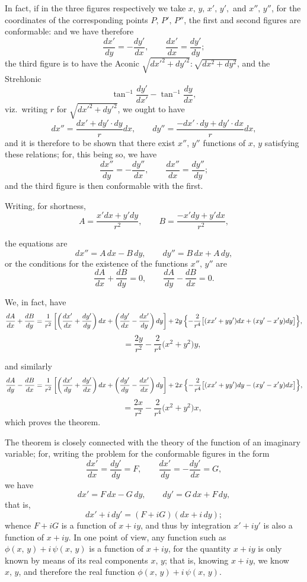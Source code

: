 \documentclass[11pt]{article}
\begin{document}
\medskip

\noindent
In fact, if in the three figures respectively we take $x,\,y,\,x',\,y',$ and $x'',\,y''$, for
the coordinates of the corresponding points $P,\,P',\,P''$, the first and second figures
are conformable: and we have therefore
\[
\frac{dx'}{dy} = -\frac{dy'}{dx},\qquad \frac{dx'}{dx} = \frac{dy'}{dy};
\]
the third figure is to have the Aconic $\sqrt{dx'^2 + dy'^2}:\sqrt{dx^2 + dy^2}$, and the Strehlonic
\[
\tan^{-1}\frac{dy'}{dx'} - \tan^{-1}\frac{dy}{dx},
\]
viz.\ writing $r$ for $\sqrt{dx'^2 + dy'^2}$, we ought to have
\[
dx'' = \frac{dx' + dy' \cdot dy}{r}dx,\qquad dy'' = \frac{-dx' \cdot dy + dy' \cdot dx}{r}dx,
\]
and it is therefore to be shown that there exist $x'',\,y''$ functions of $x,\,y$ satisfying
these relations; for, this being so, we have
\[
\frac{dx''}{dy} = -\frac{dy''}{dx},\qquad \frac{dx''}{dx} = \frac{dy''}{dy};
\]
and the third figure is then conformable with the first.

\medskip

\noindent
Writing, for shortness,
\[
A = \frac{x'dx + y'dy}{r^2},\qquad B = \frac{-x'dy + y'dx}{r^2},
\]

\newpage

\noindent
the equations are
\[
dx'' = A\,dx - B\,dy,\qquad dy'' = B\,dx + A\,dy,
\]
or the conditions for the existence of the functions $x'',\,y''$ are
\[
\frac{dA}{dx} + \frac{dB}{dy} = 0,\qquad \frac{dA}{dy} - \frac{dB}{dx} = 0.
\]

\noindent
We, in fact, have
\[
\frac{dA}{dx} + \frac{dB}{dy} = \frac{1}{r^2}\left[\left(\frac{dx'}{dx} + \frac{dy'}{dy}\right)dx + \left(\frac{dy'}{dx} - \frac{dx'}{dy}\right)dy\right] + 2y\,\Bigl\{ - \frac{2}{r^4}\bigl[(xx' + yy')dx + (xy' - x'y)dy\bigr]\Bigr\},
\]
\[
\qquad = \frac{2y}{r^2} - \frac{2}{r^4}\bigl(x^2 + y^2\bigr)y,
\]

\noindent
and similarly
\[
\frac{dA}{dy} - \frac{dB}{dx} = \frac{1}{r^2}\left[\left(\frac{dx'}{dy} + \frac{dy'}{dx}\right)dx + \left(\frac{dy'}{dy} - \frac{dx'}{dx}\right)dy\right] + 2x\,\Bigl\{- \frac{2}{r^4}\bigl[(xx' + yy')dy - (xy' - x'y)dx\bigr]\Bigr\},
\]
\[
\qquad = \frac{2x}{r^2} - \frac{2}{r^4}\bigl(x^2 + y^2\bigr)x,
\]
which proves the theorem.

\medskip

\noindent
The theorem is closely connected with the theory of the function of an imaginary
variable; for, writing the problem for the conformable figures in the form
\[
\frac{dx'}{dx} = \frac{dy'}{dy} = F,\qquad \frac{dx'}{dy} = -\frac{dy'}{dx} = G,
\]
we have
\[
dx' = F\,dx - G\,dy,\qquad dy' = G\,dx + F\,dy,
\]
that is,
\[
dx' + i\,dy' = (F + iG)(dx + i\,dy);
\]
whence $F + iG$ is a function of $x + iy$, and thus by integration $x' + iy'$ is also a
function of $x + iy$. In one point of view, any function such as $\phi(x,\,y) + i\,\psi(x,\,y)$ is
a function of $x + iy$, for the quantity $x + iy$ is only known by means of its real
components $x,\,y$; that is, knowing $x + iy$, we know $x,\,y$, and therefore the real
function $\phi(x,\,y) + i\,\psi(x,\,y)$.
\end{document}
